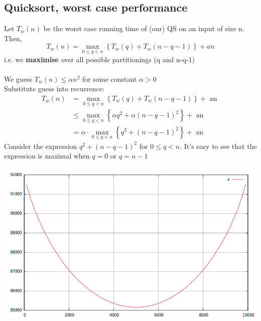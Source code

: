 \documentclass{article}[18pt]
\begin{document}
\subsection{Quicksort, worst case performance}
Let $T_w(n)$ be the worst case running time of (our) QS on an input of size n. Then,
$$T _ { w } ( n ) = \max _ { 0 \leq q < n } \left\{ T _ { w } ( q ) + T _ { w } ( n - q - 1 ) \right\} + a n$$
i.e. we \textbf{maximise} over all possible partitionings (q and n-q-1)\\
\\
We guess $T_w(n)\leqslant \alpha n^2$ for some constant $\alpha>0$\\
Substitute guess into recurrence:
$$\begin{aligned} T _ { w } ( n ) & = \max _ { 0 \leq q < n } \left\{ T _ { w } ( q ) + T _ { w } ( n - q - 1 ) \right\} + \text { an } \\ & \leq \max _ { 0 \leq q < n } \left\{ \alpha q ^ { 2 } + \alpha ( n - q - 1 ) ^ { 2 } \right\} + \text { an } \\ & = \alpha \cdot \max _ { 0 \leq q < n } \left\{ q ^ { 2 } + ( n - q - 1 ) ^ { 2 } \right\} + \text { an } \end{aligned}$$
Consider the expression $q ^ { 2 } + ( n - q - 1 ) ^ { 2 }$ for $0\leqslant q< n$. It's easy to see that the expression is maximal when $q=0$ or $q=n-1$
\begin{center}
	\includegraphics[scale=0.7]{Graph1}
\end{center}
\end{document}
